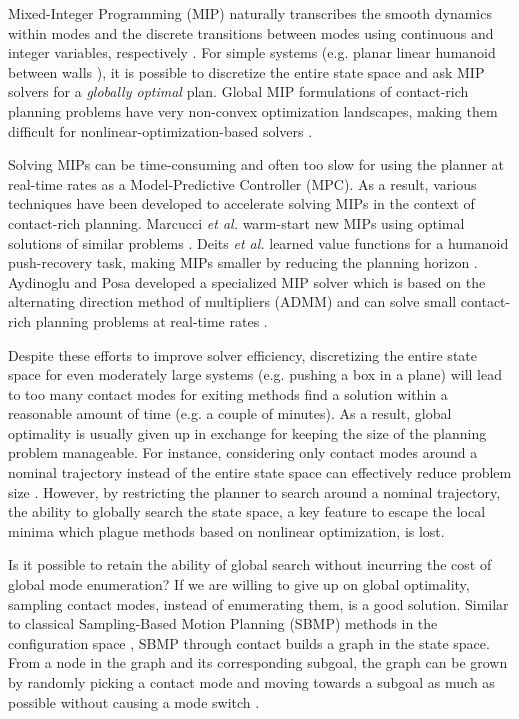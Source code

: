 Mixed-Integer Programming (MIP) \cite{bertsimas1997introduction} naturally transcribes the smooth dynamics within modes and the discrete transitions between modes using continuous and integer variables, respectively \cite{marcucci2019mixed}. For simple systems (e.g. planar linear humanoid between walls \cite{marcucci2017approximate}), it is possible to discretize the entire state space and ask MIP solvers for a \emph{globally optimal} plan. Global MIP formulations of contact-rich planning problems have very non-convex optimization landscapes, making them difficult for nonlinear-optimization-based solvers \cite{marcucci2019mixed}. 

Solving MIPs can be time-consuming and often too slow for using the planner at real-time rates as a Model-Predictive Controller (MPC). As a result, various techniques have been developed to accelerate solving MIPs in the context of contact-rich planning. Marcucci \textit{et al.} warm-start new MIPs using optimal solutions of similar problems \cite{marcucci2020warm}. Deits \textit{et al.} learned value functions for a humanoid push-recovery task, making MIPs smaller by reducing the planning horizon \cite{deits2019lvis}. Aydinoglu and Posa developed a specialized MIP solver which is based on the alternating direction method of multipliers (ADMM) and can solve small contact-rich planning problems at real-time rates \cite{aydinoglu2022real}.

Despite these efforts to improve solver efficiency, discretizing the entire state space for even moderately large systems (e.g. pushing a box in a plane) will lead to too many contact modes for exiting methods find a solution within a reasonable amount of time (e.g. a couple of minutes). As a result, global optimality is usually given up in exchange for keeping the size of the planning problem manageable. For instance, considering only contact modes around a nominal trajectory instead of the entire state space can effectively reduce problem size \cite{hogan2020feedback, aceituno2020global}. However, by restricting the planner to search around a nominal trajectory, the ability to globally search the state space, a key feature to escape the local minima which plague methods based on nonlinear optimization, is lost. 

Is it possible to retain the ability of global search without incurring the cost of global mode enumeration? If we are willing to give up on global optimality, sampling contact modes, instead of enumerating them, is a good solution. Similar to classical Sampling-Based Motion Planning (SBMP) methods in the configuration space \cite{lavalle2006planning}, SBMP through contact builds a graph in the state space. From a node in the graph and its corresponding subgoal, the graph can be grown by randomly picking a contact mode and moving towards a subgoal as much as possible without causing a mode switch \cite{cheng2021contact, wu2020r3t}. 

